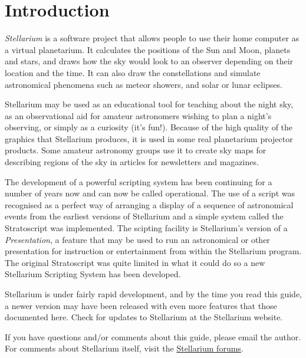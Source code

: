 
\chapter{Introduction}

\emph{Stellarium} is a software project that allows people to use their
home computer as a virtual planetarium. It calculates the positions of
the Sun and Moon, planets and stars, and draws how the sky would look to
an observer depending on their location and the time. It can also draw
the constellations and simulate astronomical phenomena such as meteor
showers, and solar or lunar eclipses.

Stellarium may be used as an educational tool for teaching about the
night sky, as an observational aid for amateur astronomers wishing to
plan a night's observing, or simply as a curiosity (it's fun!). Because
of the high quality of the graphics that Stellarium produces, it is used
in some real planetarium projector products. Some amateur astronomy
groups use it to create sky maps for describing regions of the sky in
articles for newsletters and magazines.

The development of a powerful scripting system has been continuing for a
number of years now and can now be called operational. The use of a
script was recognised as a perfect way of arranging a display of a
sequence of astronomical events from the earliest versions of Stellarium
and a simple system called the Stratoscript was implemented. The
scipting facility is Stellarium's version of a \emph{Presentation}, a
feature that may be used to run an astronomical or other presentation
for instruction or entertainment from within the Stellarium program. The
original Stratoscript was quite limited in what it could do so a new
Stellarium Scripting System has been developed.

Stellarium is under fairly rapid development, and by the time you read
this guide, a newer version may have been released with even more
features that those documented here. Check for updates to Stellarium at
the Stellarium website.

If you have questions and/or comments about this guide, please email the
author. For comments about Stellarium itself, visit the
\href{https://sourceforge.net/p/stellarium/discussion/278769/}{Stellarium
forums}.
